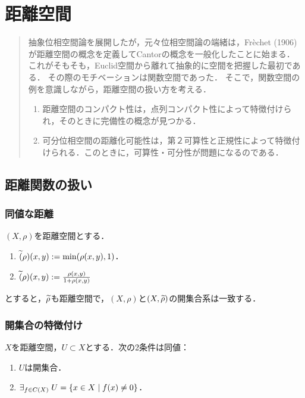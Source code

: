 \documentclass[uplatex,dvipdfmx]{jsreport}
\begin{document}
\chapter{距離空間}

\begin{quotation}
    抽象位相空間論を展開したが，元々位相空間論の端緒は，Fr\`{e}chet (1906)が距離空間の概念を定義してCantorの概念を一般化したことに始まる．
    これがそもそも，Euclid空間から離れて抽象的に空間を把握した最初である．
    その際のモチベーションは関数空間であった．
    そこで，関数空間の例を意識しながら，距離空間の扱い方を考える．
    \begin{enumerate}
        \item 距離空間のコンパクト性は，点列コンパクト性によって特徴付けられ，そのときに完備性の概念が見つかる．
        \item 可分位相空間の距離化可能性は，第２可算性と正規性によって特徴付けられる．このときに，可算性・可分性が問題になるのである．
    \end{enumerate}
\end{quotation}

\section{距離関数の扱い}

\subsection{同値な距離}

\begin{proposition}
    $(X,\rho)$を距離空間とする．
    \begin{enumerate}
        \item $\widetilde{(}\rho)(x,y):=\min(\rho(x,y),1)$．
        \item $\widetilde{(}\rho)(x,y):=\frac{\rho(x,y)}{1+\rho(x,y)}$
    \end{enumerate}
    とすると，$\widetilde{\rho}$も距離空間で，$(X,\rho)$と$(X,\widetilde{\rho})$の開集合系は一致する．
\end{proposition}

\subsection{開集合の特徴付け}

\begin{proposition}
    $X$を距離空間，$U\subset X$とする．次の2条件は同値：
    \begin{enumerate}
        \item $U$は開集合．
        \item $\exists_{f\in C(X)}\;U=\left\{x\in X\mid f(x)\ne0\right\}$．
    \end{enumerate}
\end{proposition}
\end{document}
